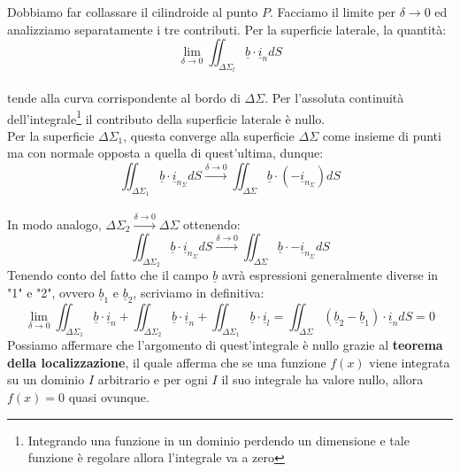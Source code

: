 \documentclass{book}
\begin{document}
        Dobbiamo far collassare il cilindroide al punto $P$. Facciamo il limite per $\delta \to 0$ ed analizziamo separatamente i tre contributi. Per la superficie laterale, la quantità:
        \begin{equation}
            \lim_{\delta \to 0} \iint_{\Delta \Sigma_{l}} \underline{b} \cdot \underline{i}_{n} dS
        \end{equation}
        \\ tende alla curva corrispondente al bordo di $\Delta \Sigma$. Per l'assoluta continuità dell'integrale\footnote{Integrando una funzione in un dominio perdendo un dimensione e tale funzione è regolare allora l'integrale va a zero} il contributo della superficie laterale è nullo. \\
        Per la superficie $\Delta \Sigma_{1}$, questa converge alla superficie $\Delta \Sigma$ come insieme di punti ma con normale opposta a quella di quest'ultima, dunque:
        \begin{equation}
            \iint_{\Delta \Sigma_{1}} \underline{b} \cdot \underline{i}_{n_{\Sigma}} dS \stackrel{\delta \to 0}{\to}  \iint_{\Delta \Sigma} \underline{b} \cdot (- \underline{i}_{n_{\Sigma}} )dS
        \end{equation} \\
        In modo analogo, $\Delta\Sigma_{2} \stackrel{ \delta \to 0}{\to} \Delta \Sigma$ ottenendo:
        \begin{equation}
            \iint_{\Delta \Sigma_{2}} \underline{b} \cdot \underline{i}_{n_{\Sigma}} dS \stackrel{\delta \to 0}{\to}  \iint_{\Delta \Sigma} \underline{b} \cdot - \underline{i}_{n_{\Sigma}} dS
        \end{equation}
        Tenendo conto del fatto che il campo $\underline{b}$ avrà espressioni generalmente diverse in "1" e "2", ovvero $\underline{b}_{1}$ e $\underline{b}_{2}$, scriviamo in definitiva:
        \begin{equation}
            \lim_{\delta \to 0} \iint_{\Delta \Sigma_{1}} \underline{b} \cdot \underline{i}_{n} + \iint_{\Delta \Sigma_{2}} \underline{b} \cdot \underline{i}_{n} + \iint_{\Delta \Sigma_{1}} \underline{b} \cdot \underline{i}_{l} = \iint_{\Delta \Sigma} (\underline{b}_{2}-\underline{b}_{1}) \cdot \underline{i}_{n}dS = 0
        \end{equation}
        Possiamo affermare che l'argomento di quest'integrale è nullo grazie al \textbf{teorema della localizzazione}, il quale afferma che se una funzione $f(x)$ viene integrata su un dominio $I$ arbitrario e per ogni $I$ il suo integrale ha valore nullo, allora $f(x) = 0$ quasi ovunque. \\
\end{document}
